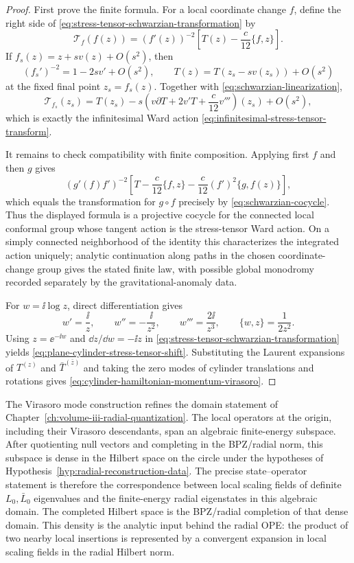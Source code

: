 \begin{proof}
First prove the finite formula.  For a local coordinate change \(f\), define
the right side of \eqref{eq:stress-tensor-schwarzian-transformation} by
\[
  \mathcal T_f(f(z))
  =
  (f'(z))^{-2}
  \left[T(z)-\frac c{12}\{f,z\}\right].
\]
If \(f_s(z)=z+s v(z)+O(s^2)\), then
\[
  (f_s')^{-2}=1-2s v'+O(s^2),
  \qquad
  T(z)=T(z_s-sv(z_s))+O(s^2)
\]
at the fixed final point \(z_s=f_s(z)\).  Together with
\eqref{eq:schwarzian-linearization},
\[
  \mathcal T_{f_s}(z_s)
  =
  T(z_s)
  -s\left(
    v\partial T+2v'T+\frac c{12}v'''
  \right)(z_s)
  +O(s^2),
\]
which is exactly the infinitesimal Ward action
\eqref{eq:infinitesimal-stress-tensor-transform}.

It remains to check compatibility with finite composition.  Applying first
\(f\) and then \(g\) gives
\[
  (g'(f)f')^{-2}
  \left[
    T
    -\frac c{12}\{f,z\}
    -\frac c{12}(f')^2\{g,f(z)\}
  \right],
\]
which equals the transformation for \(g\circ f\) precisely by
\eqref{eq:schwarzian-cocycle}.  Thus the displayed formula is a
projective cocycle for the connected local conformal group whose tangent
action is the stress-tensor Ward action.  On a simply connected
neighborhood of the identity this characterizes the integrated action
uniquely; analytic continuation along paths in the chosen coordinate-change
group gives the stated finite law, with possible global monodromy recorded
separately by the gravitational-anomaly data.

For \(w=\ii\log z\), direct differentiation gives
\[
  w'=\frac{\ii}{z},\qquad
  w''=-\frac{\ii}{z^2},\qquad
  w'''=\frac{2\ii}{z^3},
  \qquad
  \{w,z\}=\frac{1}{2z^2}.
\]
Using \(z=\ee^{-\ii w}\) and \(\dd z/\dd w=-\ii z\) in
\eqref{eq:stress-tensor-schwarzian-transformation} yields
\eqref{eq:plane-cylinder-stress-tensor-shift}.  Substituting the Laurent
expansions of \(T^{(z)}\) and \(\bar T^{(\bar z)}\) and taking the zero modes
of cylinder translations and rotations gives
\eqref{eq:cylinder-hamiltonian-momentum-virasoro}.
\end{proof}

\begin{remark}[Local operators and the radial Hilbert completion in \(D=2\)]
The Virasoro mode construction refines the domain statement of
Chapter~\ref{ch:volume-iii-radial-quantization}.  The local
operators at the origin, including their Virasoro descendants, span an
algebraic finite-energy subspace.  After quotienting null vectors and
completing in the BPZ/radial norm, this subspace is dense in the Hilbert
space on the circle under the hypotheses of
Hypothesis~\ref{hyp:radial-reconstruction-data}.  The precise
state--operator statement is therefore the correspondence between local
scaling fields of definite \(L_0,\bar L_0\) eigenvalues and the finite-energy
radial eigenstates in this algebraic domain.  The completed Hilbert space is
the BPZ/radial completion of that dense domain.
This density is the analytic input behind the radial OPE: the product of two
nearby local insertions is represented by a convergent expansion in local
scaling fields in the radial Hilbert norm.
\end{remark}
